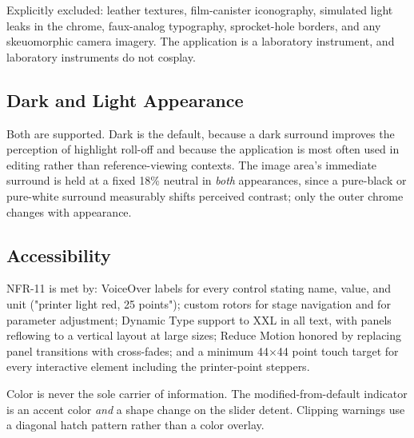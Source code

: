 Explicitly excluded: leather textures, film-canister iconography, simulated
light leaks in the chrome, faux-analog typography, sprocket-hole borders, and
any skeuomorphic camera imagery. The application is a laboratory instrument, and
laboratory instruments do not cosplay.

\subsection{Dark and Light Appearance}

Both are supported. Dark is the default, because a dark surround improves the
perception of highlight roll-off and because the application is most often used
in editing rather than reference-viewing contexts. The image area's immediate
surround is held at a fixed 18\% neutral in \emph{both} appearances, since a
pure-black or pure-white surround measurably shifts perceived contrast; only the
outer chrome changes with appearance.

\subsection{Accessibility}

NFR-11 is met by: VoiceOver labels for every control stating name, value, and
unit ("printer light red, 25 points"); custom rotors for stage navigation and
for parameter adjustment; Dynamic Type support to XXL in all text, with panels
reflowing to a vertical layout at large sizes; Reduce Motion honored by
replacing panel transitions with cross-fades; and a minimum 44$\times$44 point
touch target for every interactive element including the printer-point steppers.

Color is never the sole carrier of information. The modified-from-default
indicator is an accent color \emph{and} a shape change on the slider detent.
Clipping warnings use a diagonal hatch pattern rather than a color overlay.
